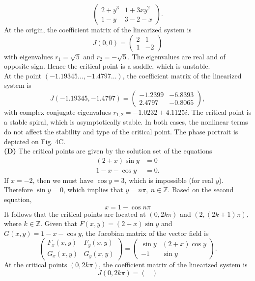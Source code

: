 \documentclass[11pt,a4paper]{article}
\begin{document}
\begin{enumerate}
$$		\begin{pmatrix}
			2 + y^3 & 1 + 3xy^2\\
			1 - y & 3 - 2 - x
		\end{pmatrix}.
		$$
		At the origin, the coefficient matrix of the linearized system is
		$$
		J(0, 0) =
		\begin{pmatrix}
			2 & 1\\
			1 & -2
		\end{pmatrix}
		$$
		with eigenvalues $r_1 = \sqrt{5}$ and $r_2 = -\sqrt{5}$. The eigenvalues are real and of opposite sign. Hence the critical point is a saddle, which is unstable.\\
		At the point $(-1.19345\ldots, -1.4797\ldots)$, the coefficient matrix of the linearized system is
		$$
		J(-1.19345, -1.4797) = 
		\begin{pmatrix}
			-1.2399 & -6.8393\\
			2.4797 & -0.8065
		\end{pmatrix},
		$$
		with complex conjugate eigenvalues $r_{1,2} = -1.0232 \pm 4.1125i$. The critical point is a stable spiral, which is asymptotically stable. In both cases, the nonlinear terms do not affect the stability and type of the critical point. The phase portrait is depicted on Fig. 4C.\\
		\textbf{(D)} The critical points are given by the solution set of the equations
		\begin{align*}
			(2 + x)\sin y &= 0\\
			1 - x - \cos y &= 0.
		\end{align*}
		If $x = -2$, then we must have $\cos y = 3$, which is impossible (for real $y$). Therefore $\sin y = 0$, which implies that $y = n\pi,\ n \in \mathbb{Z}$. Based on the second equation,
		$$
		x = 1 - \cos n\pi
		$$
		It follows that the critical points are located at $(0, 2k\pi)$ and $(2, (2k + 1)\pi)$, where $k \in \mathbb{Z}$. Given that $F(x, y) = (2 + x) \sin y$ and $G(x, y) = 1 - x - \cos y$, the Jacobian matrix of the vector field is
		$$
		\begin{pmatrix}
			F_x(x, y) & F_y(x, y)\\
			G_x(x, y) & G_y(x, y)
		\end{pmatrix} =
		\begin{pmatrix}
			\sin y & (2+x)\cos y\\
			-1 & \sin y
		\end{pmatrix}.
		$$
		At the critical points $(0, 2k\pi)$, the coefficient matrix of the linearized system is
		$$
		J(0, 2k\pi) =
		\begin{pmatrix}

\end{pmatrix}$$
\end{enumerate}
\end{document}
